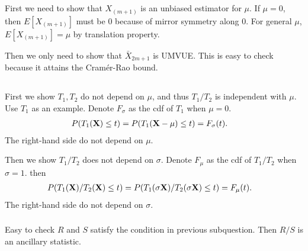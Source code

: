 \subsection{} %

First we need to show that $X_{(m+1)}$ is an unbiased estimator for $\mu$.
If $\mu=0$, then $E[X_{(m+1)}]$ must be $0$ because of mirror symmetry along $0$.
For general $\mu$, $E[X_{(m+1)}]=\mu$ by translation property.

Then we only need to show that $\bar{X}_{2m+1}$ is UMVUE.
This is easy to check because it attains the Cram\'er-Rao bound.

\subsection{} %

\subsubsection{} %

First we show $T_1, T_2$ do not depend on $\mu$,
and thus $T_1/T_2$ is independent with $\mu$.
Use $T_1$ as an example.
Denote $F_\sigma$ as the cdf of $T_1$ when $\mu=0$.
\begin{align}
    P(T_1(\mathbf{X})\le t)
        &= P(T_1(\mathbf{X}-\mu)\le t) = F_\sigma(t).
\end{align}
The right-hand side do not depend on $\mu$.

Then we show $T_1/T_2$ does not depend on $\sigma$.
Denote $F_\mu$ as the cdf of $T_1/T_2$ when $\sigma=1$.
then
\begin{align}
    P(T_1(\mathbf{X})/T_2(\mathbf{X})\le t)
        &= P(T_1(\sigma\mathbf{X})/T_2(\sigma\mathbf{X})\le t)
        = F_\mu (t).
\end{align}
The right-hand side do not depend on $\sigma$.

\subsubsection{} %

Easy to check $R$ and $S$ satisfy the condition in previous subquestion.
Then $R/S$ is an ancillary statistic.
